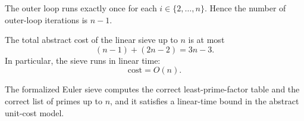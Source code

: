 \begin{lemma}
    \label{lem:outer_iterations_bound}
    The outer loop runs exactly once for each $i\in\{2,\dots,n\}$.
    Hence the number of outer-loop iterations is $n-1$.
\end{lemma}

\begin{theorem}
    \label{thm:linear_time}
    The total abstract cost of the linear sieve up to $n$ is at most
    \[
        (n-1) + (2n-2) = 3n-3.
    \]
    In particular, the sieve runs in linear time:
    \[
        \mathrm{cost} = O(n).
    \]
\end{theorem}

\begin{corollary}
    \label{cor:verified_linear_sieve}
    The formalized Euler sieve computes the correct least-prime-factor table and the correct list of primes up to $n$, and it satisfies a linear-time bound in the abstract unit-cost model.
\end{corollary}